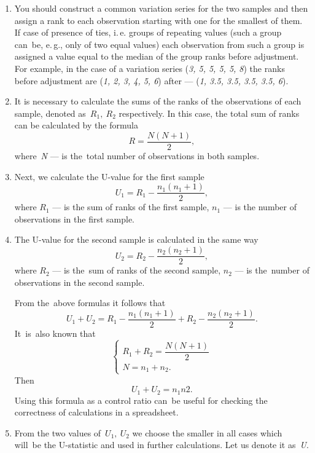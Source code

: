 \documentclass[]{scrreprt}
\begin{document}
\begin{enumerate}
	\item You should construct a common variation series for the two samples and then assign a rank to each observation starting with one for the smallest of them. If case of presence of ties, i.\,e. groups of repeating values (such a group can~be, e.\,g., only of two equal values) each observation from such a group is assigned a value equal to the median of the group ranks before adjustment. For example, in the case of a variation series (\textit{3, 5, 5, 5, 5, 8}) the ranks before adjustment are (\textit{1, 2, 3, 4, 5, 6}) after --- (\textit{1, 3.5, 3.5, 3.5, 3.5, 6}).
	\item It is necessary to calculate the sums of the ranks of the observations of each sample, denoted as~${R_{1},\ R_{2}}$ respectively. In this case, the total sum of ranks can be calculated by the formula
	\begin{equation}\label{eq:common-R}
	R = \frac{N(N+1)}{2},
	\end{equation}
	where~\textit{N} --- is the~total number of observations in both samples.
	\item Next, we calculate the U-value for the first sample
	\begin{equation}\label{eq:U1}
	U_{1}=R_{1}-\frac{n_{1}(n_{1}+1)}{2},
	\end{equation}
	where $R_{1}$ --- is the sum of ranks of the first sample, $n_{1}$ --- is the number of observations in the first sample.
	\item The U-value for the second sample is calculated in the same way
	\begin{equation}\label{eq:U2}
	U_{2}=R_{2}-\frac{n_{2}(n_{2}+1)}{2},
	\end{equation}
	where $R_{2}$ --- is the~sum of ranks of the second sample, $n_{2}$ --- is the~number of observations in the second sample.
	
	From the~above formulas it follows that
	\begin{equation}\label{eq:U1-U2-relation}
	U_{1}+U_{2} = R_{1}-\frac{n_{1}(n_{1}+1)}{2} + R_{2}-\frac{n_{2}(n_{2}+1)}{2}.
	\end{equation}
	It~is~also known that
	\begin{equation}\label{eq:R-N-relation}
	\begin{cases}
	R_{1}+R_{2}=\dfrac{N(N+1)}{2}\\
	N=n_{1}+n_{2}.
	\end{cases}
	\end{equation}
	Then
	\begin{equation}\label{eq:check-U-value}
	U_{1}+U_{2}=n_{1}n{2}.
	\end{equation}
	Using this formula as a control ratio can~be useful for checking the correctness of calculations in a spreadsheet.
	\item From the two values of~$U_{1},\ U_{2}$ we choose the smaller in all cases which will~be the U-statistic and used in further calculations. Let us denote it as~\emph{U}.
\end{enumerate}
%
\end{document}
